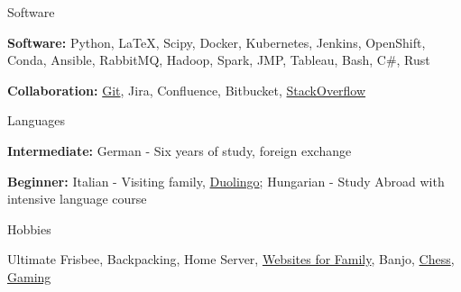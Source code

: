 

\begin{cventries}

  \cventry
    {Software} %
    {} %
    {} %
    {} %
    {
      \begin{cvitems} %
        \item {\textbf{Software:} Python, \LaTeX, Scipy, Docker, Kubernetes, Jenkins, OpenShift, Conda, Ansible, RabbitMQ, Hadoop, Spark, JMP, Tableau, Bash, C\#, Rust}
        \item {\textbf{Collaboration:} \href{https://github.com/severalfew}{Git}, Jira, Confluence, Bitbucket, \href{https://stackoverflow.com/users/5037133/snygard}{StackOverflow}}
      \end{cvitems}
    }
  \cventry
    {Languages} %
    {} %
    {} %
    {} %
    {
      \begin{cvitems} %
        \item {\textbf{Intermediate:} German - Six years of study, foreign exchange}
        \item {\textbf{Beginner:} Italian - Visiting family, \href{https://www.duolingo.com/profile/grey_ranger}{Duolingo}; Hungarian - Study Abroad with intensive language course}
      \end{cvitems}
    }
  \cventry
    {Hobbies} %
    {} %
    {} %
    {} %
    {
      \begin{cvitems} %
        \item {Ultimate Frisbee, Backpacking, Home Server, \href{https://mallorynygard.com}{Websites for Family}, Banjo, \href{https://www.chess.com/member/grey_ranger}{Chess}, \href{https://steamcommunity.com/id/grey_ranger/}{Gaming}}
      \end{cvitems}
    }
\end{cventries}
